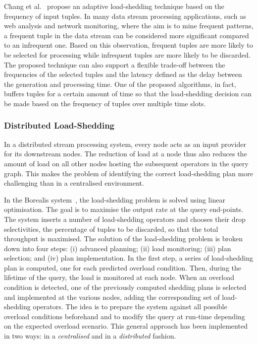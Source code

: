 Chang et al.~\cite{loadshed-chang} propose an adaptive \mbox{load-shedding} technique based on the
frequency of input tuples. 
In many data stream processing applications, such as web analysis and network monitoring,
where the aim is to mine frequent patterns, a frequent tuple in the data stream can be considered
more significant compared to an infrequent one. 
Based on this observation, frequent tuples are more likely to be selected for processing while
infrequent tuples are more likely to be discarded.
The proposed technique can also support a flexible trade-off between the frequencies of the
selected tuples and the latency defined as the delay between the generation and processing time.
One of the proposed algorithms, in fact, buffers tuples for a certain amount of time so that the
\mbox{load-shedding} decision can be made based on the frequency of tuples over multiple time slots.

\subsubsection*{Distributed \mbox{Load-Shedding}}
In a distributed stream processing system, every node acts as an input provider for its downstream nodes.
The reduction of load at a node thus also reduces the amount of load on all other nodes hosting the
subsequent operators in the query graph. This makes the problem of identifying the correct
\mbox{load-shedding} plan more challenging than in a centralised environment. 

In the Borealis system~\cite{borealis_load_management}, the \mbox{load-shedding} problem is solved using
linear optimisation.
The goal is to maximise the output rate at the query end-points. The system inserts a number of
\mbox{load-shedding} operators and chooses their drop selectivities, the percentage of tuples to be
discarded, so that the total throughput is maximised. The solution of the \mbox{load-shedding} problem is broken down into
four steps: (i) advanced planning; (ii) load monitoring; (iii) plan selection; and
(iv) plan implementation. In the first step, a series of \mbox{load-shedding} plan is computed, one for each
predicted overload condition. Then, during the lifetime of the query, the load is monitored at
each node. When an overload condition is detected, one of the previously computed shedding plans is
selected and implemented at the various nodes, adding the corresponding set of \mbox{load-shedding}
operators. The idea is to prepare the system against all possible overload conditions beforehand and to
modify the query at run-time depending on the expected overload scenario. This general approach has been
implemented in two ways: in a \emph{centralised} and in a \emph{distributed} fashion.

